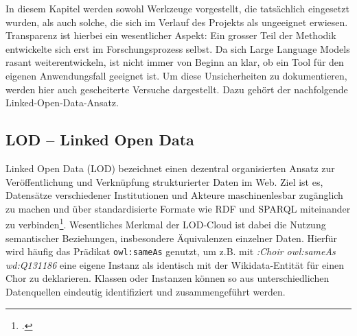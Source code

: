 \documentclass[12pt, a4paper, ngerman, bidi=default]{article}
\let\cite\footcite
\begin{document}
In diesem Kapitel werden sowohl Werkzeuge vorgestellt, die tatsächlich eingesetzt wurden, als auch solche, die sich 
im Verlauf des Projekts als ungeeignet erwiesen. Transparenz ist hierbei ein wesentlicher Aspekt: Ein grosser Teil der 
Methodik entwickelte sich erst im Forschungsprozess selbst. Da sich Large Language Models rasant weiterentwickeln, 
ist nicht immer von Beginn an klar, ob ein Tool für den eigenen Anwendungsfall geeignet ist.
Um diese Unsicherheiten zu dokumentieren, werden hier auch gescheiterte Versuche dargestellt. Dazu gehört der nachfolgende Linked-Open-Data-Ansatz.

\subsection{LOD – Linked Open Data}\label{subsec:LOD}

Linked Open Data (LOD) bezeichnet einen dezentral organisierten Ansatz zur Veröffentlichung und 
Verknüpfung strukturierter Daten im Web. Ziel ist es, Datensätze verschiedener Institutionen und Akteure 
maschinenlesbar zugänglich zu machen und über standardisierte Formate wie RDF und SPARQL miteinander zu 
verbinden\cite[vgl.][S.~VI und 13f]{garoufallou_metadata_2020}.
Wesentliches Merkmal der LOD-Cloud ist dabei die Nutzung semantischer Beziehungen, insbesondere Äquivalenzen einzelner Daten. 
Hierfür wird häufig das Prädikat \texttt{owl:sameAs} genutzt, um z.B. mit \colorbox{VeryLightGray}{\textit{:Choir owl:sameAs wd:Q131186}} eine eigene 
Instanz als identisch mit der Wikidata-Entität für einen Chor zu deklarieren.
Klassen oder Instanzen können so aus unterschiedlichen Datenquellen eindeutig identifiziert und zusammengeführt werden.
\end{document}
